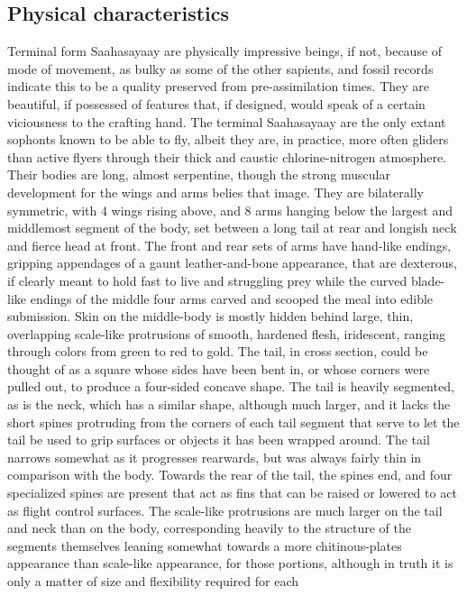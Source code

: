 \subsection{Physical characteristics}
Terminal form Saahasayaay are physically impressive beings, if not,
because of mode of movement, as bulky as some of the other sapients,
and fossil records indicate this to be a quality preserved from
pre-assimilation times. They are beautiful, if possessed of features
that, if designed, would speak of a certain viciousness to the
crafting hand. The terminal Saahasayaay are the only extant sophonts
known to be able to fly, albeit they are, in practice, more often
gliders than active flyers through their thick and caustic
chlorine-nitrogen atmosphere. Their bodies are long, almost
serpentine, though the strong muscular development for the wings and
arms belies that image. They are bilaterally symmetric, with 4 wings
rising above, and 8 arms hanging below the largest and middlemost
segment of the body, set between a long tail at rear and longish neck
and fierce head at front. The front and rear sets of arms have
hand-like endings, gripping appendages of a gaunt leather-and-bone
appearance, that are dexterous, if clearly meant to hold fast to live
and struggling prey while the curved blade-like endings of the middle
four arms carved and scooped the meal into edible submission. Skin on
the middle-body is mostly hidden behind large, thin, overlapping
scale-like protrusions of smooth, hardened flesh, iridescent, ranging
through colors from green to red to gold. The tail, in cross section,
could be thought of as a square whose sides have been bent in, or
whose corners were pulled out, to produce a four-sided concave
shape. The tail is heavily segmented, as is the neck, which has a
similar shape, although much larger, and it lacks the short spines
protruding from the corners of each tail segment that serve to let the
tail be used to grip surfaces or objects it has been wrapped
around. The tail narrows somewhat as it progresses rearwards, but was
always fairly thin in comparison with the body. Towards the rear of
the tail, the spines end, and four specialized spines are present that
act as fins that can be raised or lowered to act as flight control
surfaces. The scale-like protrusions are much larger on the tail and
neck than on the body, corresponding heavily to the structure of the
segments themselves leaning somewhat towards a more chitinous-plates
appearance than scale-like appearance, for those portions, although in
truth it is only a matter of size and flexibility required for each
